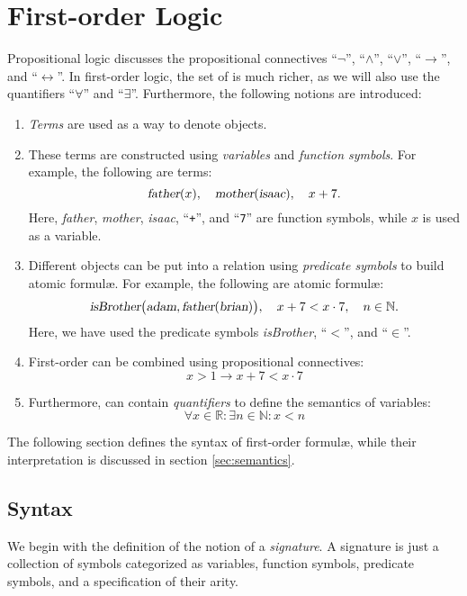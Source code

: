 \chapter{First-order Logic}
Propositional logic discusses the propositional connectives ``$\neg$'', 
``$\wedge$'', ``$\vee$'',  ``$\rightarrow$'', and ``$\leftrightarrow$''.  In first-order
logic, the set of \formulae is much richer, as we will also use the quantifiers ``$\forall$'' and
``$\exists$''.  Furthermore, the following notions are introduced:
\begin{enumerate}
\item \emph{Terms} are used as a way to denote objects.
\item These terms are constructed using  \emph{variables} and \emph{function symbols}.
      For example, the following are terms:
      \[ \textsl{father}(x),\quad \textsl{mother}(\textsl{isaac}), \quad x+7. \]
      Here, \textsl{father}, \textsl{mother}, \textsl{isaac}, ``\texttt{+}'', and ``\texttt{7}''
      are function symbols, while $x$ is used as a variable.
\item Different objects can be put into a relation using  \emph{predicate symbols} to build atomic
      formul\ae.  For example, the following are atomic formul\ae:
      \[ \textsl{isBrother}\bigl(\textsl{adam},
         \textsl{father}(\textsl{brian})\bigr),\quad x+7 < x\cdot 7,\quad n \in \mathbb{N}.
      \]
      Here, we have used the predicate symbols \textsl{isBrother}, ``$<$'', and ``$\in$''.
\item First-order \formulae can be combined using propositional connectives:
      \[ x > 1 \rightarrow x + 7 < x \cdot  7 \]
\item Furthermore, \formulae can contain  \emph{quantifiers} to define the semantics of variables:
      \[ \forall x \in \mathbb{R}: \exists n \in \mathbb{N}: x < n \]
\end{enumerate}
The following section defines the syntax of first-order formul\ae, while their interpretation is
discussed in section \ref{sec:semantics}.

\section{Syntax}
We begin with the definition of the notion of a \emph{signature}.  
A signature is just a collection of symbols categorized as variables, function symbols, predicate
symbols, and a specification of their arity.
 
